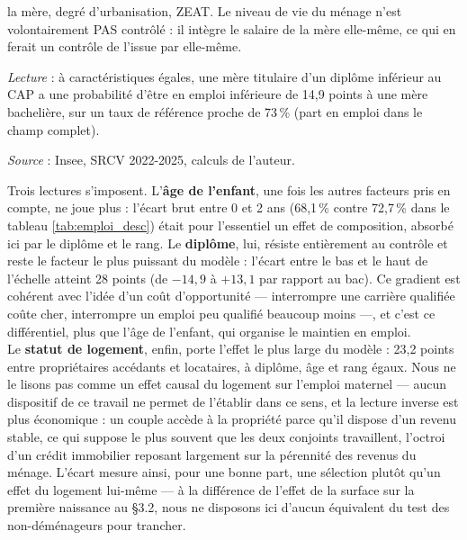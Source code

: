 \documentclass[12pt,a4paper]{article}
\begin{document}
\begin{table}[htbp]
\begin{threeparttable}
\begin{tablenotes}[flushleft]
			la mère, degré d'urbanisation, ZEAT. Le niveau de vie du ménage n'est volontairement PAS
			contrôlé : il intègre le salaire de la mère elle-même, ce qui en ferait un contrôle de
			l'issue par elle-même.
			\item \textit{Lecture} : à caractéristiques égales, une mère titulaire d'un diplôme
			inférieur au CAP a une probabilité d'être en emploi inférieure de 14,9 points à une mère
			bachelière, sur un taux de référence proche de 73\,\% (part en emploi dans le champ complet).
			\item \textit{Source} : Insee, SRCV 2022-2025, calculs de l'auteur.
		\end{tablenotes}
	\end{threeparttable}
\end{table}

\bigskip

\noindent Trois lectures s'imposent. L'\textbf{âge de l'enfant}, une fois les autres facteurs pris en compte, ne joue plus : l'écart brut entre 0 et 2 ans (68,1\,\% contre 72,7\,\% dans le tableau \ref{tab:emploi_desc}) était pour l'essentiel un effet de composition, absorbé ici par le diplôme et le rang. Le \textbf{diplôme}, lui, résiste entièrement au contrôle et reste le facteur le plus puissant du modèle : l'écart entre le bas et le haut de l'échelle atteint 28 points (de $-14{,}9$ à $+13{,}1$ par rapport au bac). Ce gradient est cohérent avec l'idée d'un coût d'opportunité — interrompre une carrière qualifiée coûte cher, interrompre un emploi peu qualifié beaucoup moins —, et c'est ce différentiel, plus que l'âge de l'enfant, qui organise le maintien en emploi. \\

\noindent Le \textbf{statut de logement}, enfin, porte l'effet le plus large du modèle : 23,2 points entre propriétaires accédants et locataires, à diplôme, âge et rang égaux. Nous ne le lisons pas comme un effet causal du logement sur l'emploi maternel — aucun dispositif de ce travail ne permet de l'établir dans ce sens, et la lecture inverse est plus économique : un couple accède à la propriété parce qu'il dispose d'un revenu stable, ce qui suppose le plus souvent que les deux conjoints travaillent, l'octroi d'un crédit immobilier reposant largement sur la pérennité des revenus du ménage. L'écart mesure ainsi, pour une bonne part, une sélection plutôt qu'un effet du logement lui-même — à la différence de l'effet de la surface sur la première naissance au §3.2, nous ne disposons ici d'aucun équivalent du test des non-déménageurs pour trancher. \\
\end{document}
